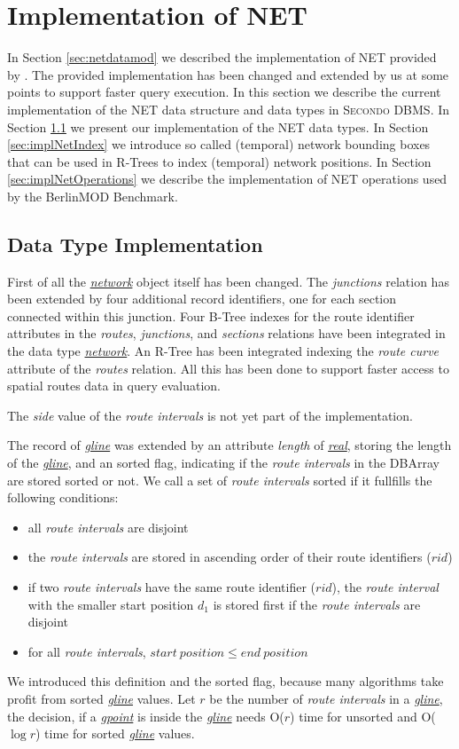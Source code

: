 \documentclass[a4paper]{article}
\newcommand{\secondo}{\textsc{Secondo}}
\newcommand{\bmodb} {BerlinMOD Benchmark}
\newcommand{\dt}[1]{\textsl{\underline{#1}}}
\begin{document}
\section{Implementation of NET}
\label{sec:implNDM}
In Section \ref{sec:netdatamod} we described the implementation of NET
provided by \cite{NetworkGueting}. The provided implementation
has been changed and extended by us at some points to support faster query
execution. In this section we describe the current implementation of the NET
data structure and data types in \secondo{} DBMS. In Section
\ref{sec:implNetDataTyp} we present our implementation of the NET data
types. In Section \ref{sec:implNetIndex} we introduce so called
(temporal) network bounding boxes that can be used in R-Trees to index
(temporal) network positions. In Section \ref{sec:implNetOperations} we
describe the implementation of NET operations used by the \bmodb{}.
\subsection{Data Type Implementation}
\label{sec:implNetDataTyp}
First of all the \dt{network} object itself has been changed. The \textit{junctions}
relation has been extended by four additional record identifiers, one for each
section connected within this junction. Four B-Tree indexes for the route
identifier attributes in the \textit{routes}, \textit{junctions}, and \textit{sections} relations
have been integrated in the data type \dt{network}. An R-Tree has been
integrated indexing the \textit{route curve} attribute
of the \textit{routes} relation. All this has been done to support faster access to
spatial routes data in query evaluation.

The \textit{side} value of the \textit{route intervals} is not yet part of the
implementation.

\label{sec:sortedgline}
The record of \dt{gline} was extended by an attribute \textit{length} of
\dt{real}, storing the length of the \dt{gline}, and an sorted flag, indicating
if the \textit{route intervals} in the DBArray are stored sorted or not. We call
a
set of \textit{route intervals} sorted if it fullfills the following conditions:
\begin{itemize}
   \item all \textit{route intervals} are disjoint
   \item the \textit{route intervals} are stored in ascending order of their
route identifiers ($rid$)
   \item if two \textit{route intervals} have the same route identifier ($rid$),
the
\textit{route interval} with the smaller start position $d_1$ is stored first if
the
\textit{route intervals} are disjoint
   \item for all \textit{route intervals}, $start\ position \le end\ position$
\end{itemize}
We introduced this definition and the sorted flag, because many algorithms take
profit
from sorted \dt{gline} values. Let $r$ be the number of \textit{route intervals}
in a
\dt{gline}, the decision, if a \dt{gpoint} is inside the \dt{gline} needs O($r$)
time for unsorted and O($\log r$) time for sorted \dt{gline} values.
\end{document}
